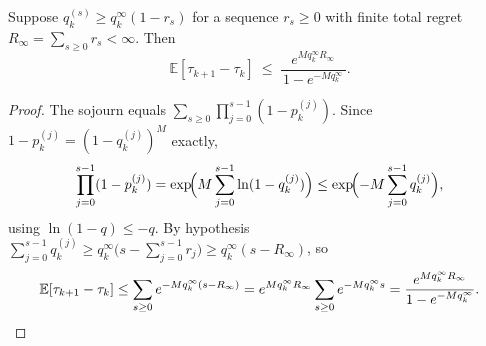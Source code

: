 \documentclass[10pt,a4paper]{amsart}
\newcommand{\E}{\mathbb{E}}
\begin{document}
\begin{theorem}\label{thm:online}
  Suppose $q_k^{(s)}\ge q_k^\infty(1-r_s)$ for a sequence $r_s\ge0$ with
  finite total regret $R_\infty=\sum_{s\ge0}r_s<\infty$.  Then
  \begin{equation}
    \E[\tau_{k+1}-\tau_k]
    \ \le\
    \frac{e^{Mq_k^\infty R_\infty}}{\,1-e^{-Mq_k^\infty}\,}.
    \label{eq:online}
  \end{equation}
\end{theorem}

\begin{proof}
  The sojourn equals $\sum_{s\ge0}\prod_{j=0}^{s-1}(1-p_k^{(j)})$.  Since
  $1-p_k^{(j)}=(1-q_k^{(j)})^M$ exactly,
  \[
    \prod_{j=0}^{s-1}(1-p_k^{(j)})
    =\exp\!\Bigl(M\sum_{j=0}^{s-1}\ln(1-q_k^{(j)})\Bigr)
    \le\exp\!\Bigl(-M\sum_{j=0}^{s-1}q_k^{(j)}\Bigr),
  \]
  using $\ln(1-q)\le-q$.  By hypothesis
  $\sum_{j=0}^{s-1}q_k^{(j)}\ge q_k^\infty\bigl(s-\sum_{j=0}^{s-1}r_j\bigr)
  \ge q_k^\infty(s-R_\infty)$, so
  \[
    \E[\tau_{k+1}-\tau_k]
    \le\sum_{s\ge0}e^{-Mq_k^\infty(s-R_\infty)}
    =e^{Mq_k^\infty R_\infty}\sum_{s\ge0}e^{-Mq_k^\infty s}
    =\frac{e^{Mq_k^\infty R_\infty}}{1-e^{-Mq_k^\infty}}.\qedhere
  \]
\end{proof}
\end{document}
